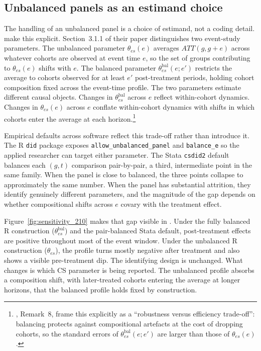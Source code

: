\subsection{Unbalanced panels as an estimand choice}
\label{sec:li_sensitivity}

The handling of an unbalanced panel is a choice of estimand, not a coding detail. \textcite{callaway2021difference} make this explicit. Section~3.1.1 of their paper distinguishes two event-study parameters. The unbalanced parameter $\theta_{es}(e)$ averages $ATT(g, g+e)$ across whatever cohorts are observed at event time $e$, so the set of groups contributing to $\theta_{es}(e)$ shifts with $e$. The balanced parameter $\theta_{es}^{\mathrm{bal}}(e; e')$ restricts the average to cohorts observed for at least $e'$ post-treatment periods, holding cohort composition fixed across the event-time profile. The two parameters estimate different causal objects. Changes in $\theta_{es}^{\mathrm{bal}}$ across $e$ reflect within-cohort dynamics. Changes in $\theta_{es}(e)$ across $e$ conflate within-cohort dynamics with shifts in which cohorts enter the average at each horizon.\footnote{\textcite{callaway2021difference}, Remark~8, frame this explicitly as a ``robustness versus efficiency trade-off'': balancing protects against compositional artefacts at the cost of dropping cohorts, so the standard errors of $\theta_{es}^{\mathrm{bal}}(e; e')$ are larger than those of $\theta_{es}(e)$.}

Empirical defaults across software reflect this trade-off rather than introduce it. The R \texttt{did} package exposes \texttt{allow\_unbalanced\_panel} and \texttt{balance\_e} so the applied researcher can target either parameter. The Stata \texttt{csdid2} default balances each $(g,t)$ comparison pair-by-pair, a third, intermediate point in the same family. When the panel is close to balanced, the three points collapse to approximately the same number. When the panel has substantial attrition, they identify genuinely different parameters, and the magnitude of the gap depends on whether compositional shifts across $e$ covary with the treatment effect.

Figure~\ref{fig:sensitivity_210} makes that gap visible in \textcite{li2025shortened}. Under the fully balanced R construction ($\theta_{es}^{\mathrm{bal}}$) and the pair-balanced Stata default, post-treatment effects are positive throughout most of the event window. Under the unbalanced R construction ($\theta_{es}$), the profile turns mostly negative after treatment and also shows a visible pre-treatment dip. The identifying design is unchanged. What changes is which CS parameter is being reported. The unbalanced profile absorbs a composition shift, with later-treated cohorts entering the average at longer horizons, that the balanced profile holds fixed by construction.

